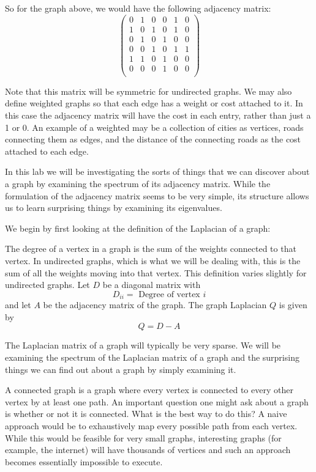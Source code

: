 So for the graph above, we would have the following adjacency matrix:
\[
\begin{pmatrix}
0 & 1 & 0 & 0 & 1 & 0 \\
1 & 0 & 1 & 0 & 1 & 0 \\
0 & 1 & 0 & 1 & 0 & 0 \\
0 & 0 & 1 & 0 & 1 & 1 \\
1 & 1 & 0 & 1 & 0 & 0 \\
0 & 0 & 0 & 1 & 0 & 0 \\
\end{pmatrix}
\]

Note that this matrix will be symmetric for undirected graphs.
We may also define weighted graphs so that each edge has a weight or cost attached to it.
In this case the adjacency matrix will have the cost in each entry, rather than just a 1 or 0.
An example of a weighted may be a collection of cities as vertices, roads connecting them as edges, and the distance of the connecting roads as the cost attached to each edge.

In this lab we will be investigating the sorts of things that we can discover about a graph by examining the spectrum of its  adjacency matrix.
While the formulation of the adjacency matrix seems to be very simple, its structure allows us to learn surprising things by examining its eigenvalues.  

We begin by first looking at the definition of the Laplacian of a graph:

\begin{definition}  The degree of a vertex in a graph is the sum of the weights connected to that vertex.
In undirected graphs, which is what we will be dealing with, this is the sum of all the weights moving into that vertex.
This definition varies slightly for undirected graphs.
Let $D$ be a diagonal matrix with
\[
D_{ii} = \mbox{ Degree of vertex $i$}
\]
and let $A$ be the adjacency matrix of the graph.
The graph Laplacian $Q$ is given by
\[
Q = D-A
\]
\end{definition}

The Laplacian matrix of a graph will typically be very sparse.
We will be examining the spectrum of the Laplacian matrix of a graph and the surprising things we can find out about a graph by simply examining it.    

A connected graph is a graph where every vertex is connected to every other vertex by at least one path.
An important question one might ask about a graph is whether or not it is connected.
What is the best way to do this?
A naive approach would be to exhaustively map every possible path from each vertex.
While this would be feasible for very small graphs, interesting graphs (for example, the internet) will have thousands of vertices and such an approach becomes essentially impossible to execute.

